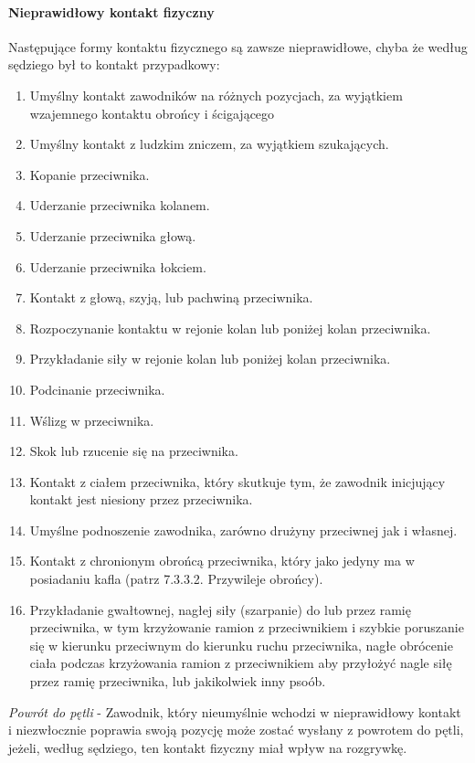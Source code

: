 \documentclass[12pt]{article}
\begin{document}
\paragraph{Nieprawidłowy kontakt fizyczny}
Następujące formy
kontaktu fizycznego są zawsze nieprawidłowe, chyba że według sędziego
był to kontakt przypadkowy:

\begin{enumerate}
\item
  Umyślny kontakt zawodników na różnych pozycjach, za wyjątkiem
  wzajemnego kontaktu obrońcy i ścigającego
\item
  Umyślny kontakt z ludzkim zniczem, za wyjątkiem szukających.
\item
  Kopanie przeciwnika.
\item
  Uderzanie przeciwnika kolanem.
\item
  Uderzanie przeciwnika głową.
\item
  Uderzanie przeciwnika łokciem.
\item
  Kontakt z głową, szyją, lub pachwiną przeciwnika.
\item
  Rozpoczynanie kontaktu w rejonie kolan lub poniżej kolan przeciwnika.
\item
  Przykładanie siły w rejonie kolan lub poniżej kolan przeciwnika.
\item
    Podcinanie przeciwnika.
  \item
  Wślizg w przeciwnika.
\item
  Skok lub rzucenie się na przeciwnika.
\item
    Kontakt z ciałem przeciwnika, który skutkuje tym, że zawodnik
  inicjujący kontakt jest niesiony przez przeciwnika.
  \item
    Umyślne podnoszenie zawodnika, zarówno drużyny przeciwnej jak i
  własnej.
  \item
  Kontakt z chronionym obrońcą przeciwnika, który jako jedyny ma w
  posiadaniu kafla (patrz 7.3.3.2. Przywileje obrońcy).
\item
  Przykładanie gwałtownej, nagłej siły (szarpanie) do lub przez ramię
  przeciwnika, w tym krzyżowanie ramion z przeciwnikiem i szybkie
  poruszanie się w kierunku przeciwnym do kierunku ruchu przeciwnika,
  nagłe obrócenie ciała podczas krzyżowania ramion z przeciwnikiem aby
  przyłożyć nagle siłę przez ramię przeciwnika, lub jakikolwiek inny
  psoób.
\end{enumerate}

\emph{Powrót do pętli} - Zawodnik, który nieumyślnie wchodzi w
nieprawidłowy kontakt i niezwłocznie poprawia swoją pozycję może zostać
wysłany z powrotem do pętli, jeżeli, według sędziego, ten kontakt
fizyczny miał wpływ na rozgrywkę.
\end{document}
